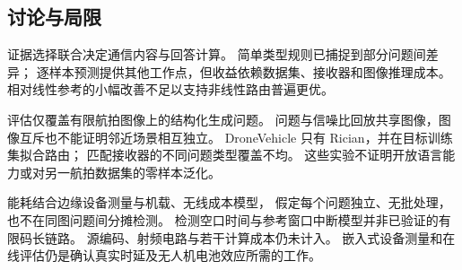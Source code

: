 \subsection{讨论与局限}\label{sec:limits}
证据选择联合决定通信内容与回答计算。
简单类型规则已捕捉到部分问题间差异；
逐样本预测提供其他工作点，但收益依赖数据集、接收器和图像推理成本。
相对线性参考的小幅改善不足以支持非线性路由普遍更优。

评估仅覆盖有限航拍图像上的结构化生成问题。
问题与信噪比回放共享图像，图像互斥也不能证明邻近场景相互独立。
DroneVehicle 只有 Rician，并在目标训练集拟合路由；
匹配接收器的不同问题类型覆盖不均。
这些实验不证明开放语言能力或对另一航拍数据集的零样本泛化。

能耗结合边缘设备测量与机载、无线成本模型，
假定每个问题独立、无批处理，也不在同图问题间分摊检测。
检测空口时间与参考窗口中断模型并非已验证的有限码长链路。
源编码、射频电路与若干计算成本仍未计入。
嵌入式设备测量和在线评估仍是确认真实时延及无人机电池效应所需的工作。
